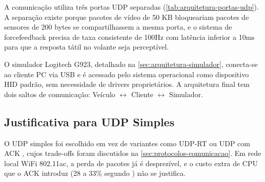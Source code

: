 A comunicação utiliza três portas \gls{UDP} separadas (\autoref{tab:arquitetura-portas-udp}). A separação existe porque pacotes de vídeo de 50 KB bloqueariam pacotes de sensores de 200 bytes se compartilhassem a mesma porta, e o sistema de \gls{forcefeedback} precisa de taxa consistente de 100Hz com latência inferior a 10ms para que a resposta tátil no volante seja perceptível.

\begin{table}[!h]
\captionsetup{width=16cm}
\end{table}

O simulador Logitech G923, detalhado na \autoref{sec:arquitetura-simulador}, conecta-se ao cliente PC via \gls{USB} e é acessado pelo sistema operacional como dispositivo \gls{HID} padrão, sem necessidade de drivers proprietários. A arquitetura final tem dois saltos de comunicação: Veículo $\leftrightarrow$ Cliente $\leftrightarrow$ Simulador.

\subsection{Justificativa para UDP Simples}
\label{subsec:justificativa-udp}

O UDP simples foi escolhido em vez de variantes como UDP-RT \cite{lu2023udprt} ou UDP com ACK \cite{bekele2024performance}, cujos trade-offs foram discutidos na \autoref{sec:protocolos-comunicacao}. Em rede local WiFi 802.11ac, a perda de pacotes já é desprezível, e o custo extra de CPU que o ACK introduz (28 a 33\% segundo ) não se justifica.


